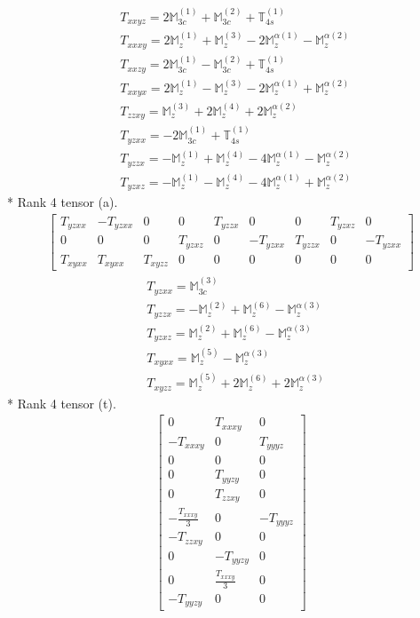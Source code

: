\documentclass[fleqn,8pt,landscape]{jsarticle}
\begin{document}
\begin{align*}
& T_{xxyz} = 2 \mathbb{M}_{3c}^{(1)} + \mathbb{M}_{3c}^{(2)} + \mathbb{T}_{4s}^{(1)} \\
& T_{xxxy} = 2 \mathbb{M}_{z}^{(1)} + \mathbb{M}_{z}^{(3)} - 2 \mathbb{M}_{z}^{\alpha(1)} - \mathbb{M}_{z}^{\alpha(2)} \\
& T_{xxzy} = 2 \mathbb{M}_{3c}^{(1)} - \mathbb{M}_{3c}^{(2)} + \mathbb{T}_{4s}^{(1)} \\
& T_{xxyx} = 2 \mathbb{M}_{z}^{(1)} - \mathbb{M}_{z}^{(3)} - 2 \mathbb{M}_{z}^{\alpha(1)} + \mathbb{M}_{z}^{\alpha(2)} \\
& T_{zzxy} = \mathbb{M}_{z}^{(3)} + 2 \mathbb{M}_{z}^{(4)} + 2 \mathbb{M}_{z}^{\alpha(2)} \\
& T_{yzxx} = - 2 \mathbb{M}_{3c}^{(1)} + \mathbb{T}_{4s}^{(1)} \\
& T_{yzzx} = - \mathbb{M}_{z}^{(1)} + \mathbb{M}_{z}^{(4)} - 4 \mathbb{M}_{z}^{\alpha(1)} - \mathbb{M}_{z}^{\alpha(2)} \\
& T_{yzxz} = - \mathbb{M}_{z}^{(1)} - \mathbb{M}_{z}^{(4)} - 4 \mathbb{M}_{z}^{\alpha(1)} + \mathbb{M}_{z}^{\alpha(2)}
\end{align*}
* Rank 4 tensor (a).
\begin{align*}
\begin{bmatrix} T_{yzxx} & - T_{yzxx} & 0 & 0 & T_{yzzx} & 0 & 0 & T_{yzxz} & 0 \\ 0 & 0 & 0 & T_{yzxz} & 0 & - T_{yzxx} & T_{yzzx} & 0 & - T_{yzxx} \\ T_{xyxx} & T_{xyxx} & T_{xyzz} & 0 & 0 & 0 & 0 & 0 & 0 \end{bmatrix}
\end{align*}
\begin{align*}
& T_{yzxx} = \mathbb{M}_{3c}^{(3)} \\
& T_{yzzx} = - \mathbb{M}_{z}^{(2)} + \mathbb{M}_{z}^{(6)} - \mathbb{M}_{z}^{\alpha(3)} \\
& T_{yzxz} = \mathbb{M}_{z}^{(2)} + \mathbb{M}_{z}^{(6)} - \mathbb{M}_{z}^{\alpha(3)} \\
& T_{xyxx} = \mathbb{M}_{z}^{(5)} - \mathbb{M}_{z}^{\alpha(3)} \\
& T_{xyzz} = \mathbb{M}_{z}^{(5)} + 2 \mathbb{M}_{z}^{(6)} + 2 \mathbb{M}_{z}^{\alpha(3)}
\end{align*}
* Rank 4 tensor (t).
\begin{align*}
\begin{bmatrix} 0 & T_{xxxy} & 0 \\ - T_{xxxy} & 0 & T_{yyyz} \\ 0 & 0 & 0 \\ 0 & T_{yyzy} & 0 \\ 0 & T_{zzxy} & 0 \\ - \frac{T_{xxxy}}{3} & 0 & - T_{yyyz} \\ - T_{zzxy} & 0 & 0 \\ 0 & - T_{yyzy} & 0 \\ 0 & \frac{T_{xxxy}}{3} & 0 \\ - T_{yyzy} & 0 & 0 \end{bmatrix}
\end{align*}
\end{document}
